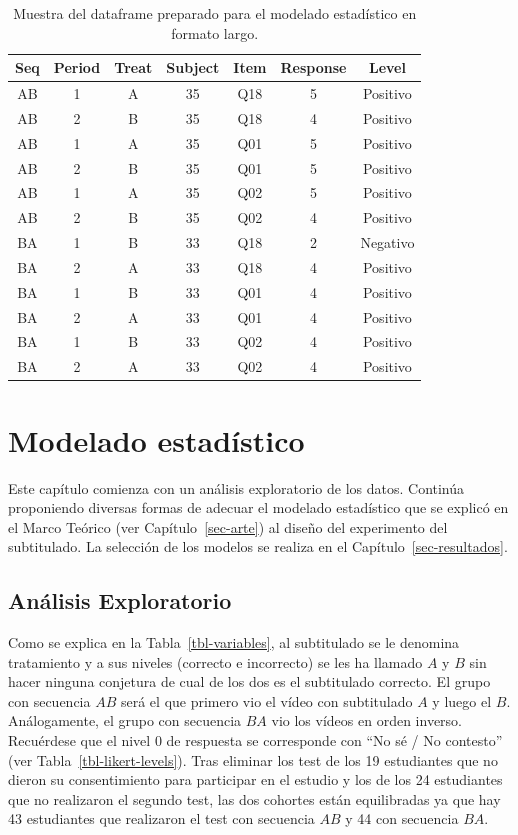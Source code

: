 \documentclass[
  12pt,
  a4paper,
  extrafontsizes,
  onecolumn,
  openright,
  table]{memoir}
\begin{document}
\hypertarget{tbl-df_response}{}
\begin{longtable}{ccccccc}
\caption{\label{tbl-df_response}Muestra del dataframe preparado para el modelado estadístico en formato
largo. }\tabularnewline

\toprule
Seq & Period & Treat & Subject & Item & Response & Level \\ 
\midrule
AB & 1 & A & 35 & Q18 & 5 & Positivo \\ 
AB & 2 & B & 35 & Q18 & 4 & Positivo \\ 
AB & 1 & A & 35 & Q01 & 5 & Positivo \\ 
AB & 2 & B & 35 & Q01 & 5 & Positivo \\ 
AB & 1 & A & 35 & Q02 & 5 & Positivo \\ 
AB & 2 & B & 35 & Q02 & 4 & Positivo \\ 
BA & 1 & B & 33 & Q18 & 2 & Negativo \\ 
BA & 2 & A & 33 & Q18 & 4 & Positivo \\ 
BA & 1 & B & 33 & Q01 & 4 & Positivo \\ 
BA & 2 & A & 33 & Q01 & 4 & Positivo \\ 
BA & 1 & B & 33 & Q02 & 4 & Positivo \\ 
BA & 2 & A & 33 & Q02 & 4 & Positivo \\ 
\bottomrule
\end{longtable}


\hypertarget{sec-modelado}{%
\chapter{Modelado estadístico}\label{sec-modelado}}

Este capítulo comienza con un análisis exploratorio de los datos.
Continúa proponiendo diversas formas de adecuar el modelado estadístico
que se explicó en el Marco Teórico (ver Capítulo~\ref{sec-arte}) al
diseño del experimento del subtitulado. La selección de los modelos se
realiza en el Capítulo~\ref{sec-resultados}.

\hypertarget{sec-eda}{%
\section{Análisis Exploratorio}\label{sec-eda}}

Como se explica en la Tabla~\ref{tbl-variables}, al subtitulado se le
denomina tratamiento y a sus niveles (correcto e incorrecto) se les ha
llamado \(A\) y \(B\) sin hacer ninguna conjetura de cual de los dos es
el subtitulado correcto. El grupo con secuencia \(AB\) será el que
primero vio el vídeo con subtitulado \(A\) y luego el \(B\).
Análogamente, el grupo con secuencia \(BA\) vio los vídeos en orden
inverso. Recuérdese que el nivel 0 de respuesta se corresponde con
\enquote{No sé / No contesto} (ver Tabla~\ref{tbl-likert-levels}). Tras
eliminar los test de los 19 estudiantes que no dieron su consentimiento
para participar en el estudio y los de los 24 estudiantes que no
realizaron el segundo test, las dos cohortes están equilibradas ya que
hay 43 estudiantes que realizaron el test con secuencia \(AB\) y 44 con
secuencia \(BA\).
\end{document}
